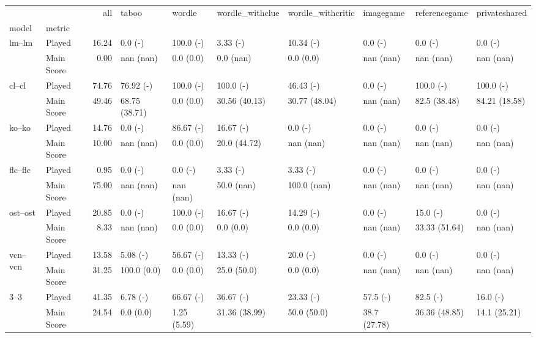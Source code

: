\begin{tabular}{llrlllllll}
\toprule
 &  & all & taboo & wordle & wordle_withclue & wordle_withcritic & imagegame & referencegame & privateshared \\
model & metric &  &  &  &  &  &  &  &  \\
\midrule
\multirow[t]{2}{*}{lm--lm} & Played & 16.24 & 0.0 (-) & 100.0 (-) & 3.33 (-) & 10.34 (-) & 0.0 (-) & 0.0 (-) & 0.0 (-) \\
 & Main Score & 0.00 & nan (nan) & 0.0 (0.0) & 0.0 (nan) & 0.0 (0.0) & nan (nan) & nan (nan) & nan (nan) \\
\cline{1-10}
\multirow[t]{2}{*}{cl--cl} & Played & 74.76 & 76.92 (-) & 100.0 (-) & 100.0 (-) & 46.43 (-) & 0.0 (-) & 100.0 (-) & 100.0 (-) \\
 & Main Score & 49.46 & 68.75 (38.71) & 0.0 (0.0) & 30.56 (40.13) & 30.77 (48.04) & nan (nan) & 82.5 (38.48) & 84.21 (18.58) \\
\cline{1-10}
\multirow[t]{2}{*}{ko--ko} & Played & 14.76 & 0.0 (-) & 86.67 (-) & 16.67 (-) & 0.0 (-) & 0.0 (-) & 0.0 (-) & 0.0 (-) \\
 & Main Score & 10.00 & nan (nan) & 0.0 (0.0) & 20.0 (44.72) & nan (nan) & nan (nan) & nan (nan) & nan (nan) \\
\cline{1-10}
\multirow[t]{2}{*}{flc--flc} & Played & 0.95 & 0.0 (-) & 0.0 (-) & 3.33 (-) & 3.33 (-) & 0.0 (-) & 0.0 (-) & 0.0 (-) \\
 & Main Score & 75.00 & nan (nan) & nan (nan) & 50.0 (nan) & 100.0 (nan) & nan (nan) & nan (nan) & nan (nan) \\
\cline{1-10}
\multirow[t]{2}{*}{ost--ost} & Played & 20.85 & 0.0 (-) & 100.0 (-) & 16.67 (-) & 14.29 (-) & 0.0 (-) & 15.0 (-) & 0.0 (-) \\
 & Main Score & 8.33 & nan (nan) & 0.0 (0.0) & 0.0 (0.0) & 0.0 (0.0) & nan (nan) & 33.33 (51.64) & nan (nan) \\
\cline{1-10}
\multirow[t]{2}{*}{vcn--vcn} & Played & 13.58 & 5.08 (-) & 56.67 (-) & 13.33 (-) & 20.0 (-) & 0.0 (-) & 0.0 (-) & 0.0 (-) \\
 & Main Score & 31.25 & 100.0 (0.0) & 0.0 (0.0) & 25.0 (50.0) & 0.0 (0.0) & nan (nan) & nan (nan) & nan (nan) \\
\cline{1-10}
\multirow[t]{2}{*}{3--3} & Played & 41.35 & 6.78 (-) & 66.67 (-) & 36.67 (-) & 23.33 (-) & 57.5 (-) & 82.5 (-) & 16.0 (-) \\
 & Main Score & 24.54 & 0.0 (0.0) & 1.25 (5.59) & 31.36 (38.99) & 50.0 (50.0) & 38.7 (27.78) & 36.36 (48.85) & 14.1 (25.21) \\

\end{tabular}
